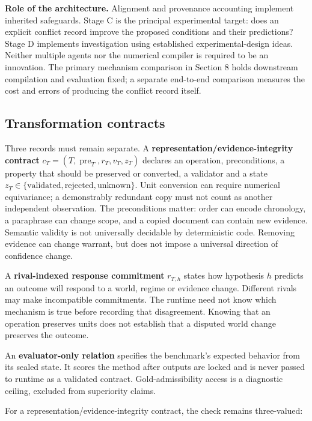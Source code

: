 \documentclass[11pt,a4paper]{article}
\begin{document}
\textbf{Role of the architecture.} Alignment and provenance accounting
implement inherited safeguards. Stage C is the principal experimental
target: does an explicit conflict record improve the proposed conditions
and their predictions? Stage D implements investigation using
established experimental-design ideas. Neither multiple agents nor the
numerical compiler is required to be an innovation. The primary
mechanism comparison in Section 8 holds downstream compilation and
evaluation fixed; a separate end-to-end comparison measures the cost and
errors of producing the conflict record itself.

\subsection{Transformation contracts}\label{transformation-contracts}

Three records must remain separate. A
\textbf{representation/evidence-integrity contract}
\(c_T=(T,\operatorname{pre}_T,r_T,v_T,z_T)\) declares an operation,
preconditions, a property that should be preserved or converted, a
validator and a state
\(z_T\in\{\text{validated},\text{rejected},\text{unknown}\}\). Unit
conversion can require numerical equivariance; a demonstrably redundant
copy must not count as another independent observation. The
preconditions matter: order can encode chronology, a paraphrase can
change scope, and a copied document can contain new evidence. Semantic
validity is not universally decidable by deterministic code. Removing
evidence can change warrant, but does not impose a universal direction
of confidence change.

A \textbf{rival-indexed response commitment} \(r_{T,h}\) states how
hypothesis \(h\) predicts an outcome will respond to a world, regime or
evidence change. Different rivals may make incompatible commitments. The
runtime need not know which mechanism is true before recording that
disagreement. Knowing that an operation preserves units does not
establish that a disputed world change preserves the outcome.

An \textbf{evaluator-only relation} specifies the benchmark's expected
behavior from its sealed state. It scores the method after outputs are
locked and is never passed to runtime as a validated contract.
Gold-admissibility access is a diagnostic ceiling, excluded from
superiority claims.

For a representation/evidence-integrity contract, the check remains
three-valued:
\end{document}
